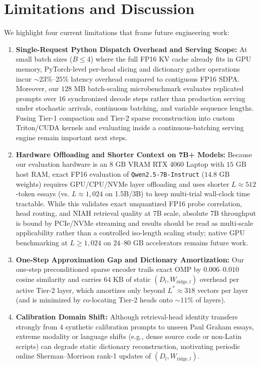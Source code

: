 \documentclass[conference]{IEEEtran}
\begin{document}
\section{Limitations and Discussion}
We highlight four current limitations that frame future engineering work:
\begin{enumerate}
    \item \textbf{Single-Request Python Dispatch Overhead and Serving Scope:} At small batch sizes ($B \le 4$) where the full FP16 KV cache already fits in GPU memory, PyTorch-level per-head slicing and dictionary gather operations incur $\sim 23\%$--$25\%$ latency overhead compared to contiguous FP16 SDPA. Moreover, our $128\text{ MB}$ batch-scaling microbenchmark evaluates replicated prompts over $16$ synchronized decode steps rather than production serving under stochastic arrivals, continuous batching, and variable sequence lengths. Fusing Tier-1 compaction and Tier-2 sparse reconstruction into custom Triton/CUDA kernels and evaluating inside a continuous-batching serving engine remain important next steps.
    \item \textbf{Hardware Offloading and Shorter Context on 7B+ Models:} Because our evaluation hardware is an $8\text{ GB}$ VRAM RTX 4060 Laptop with $15\text{ GB}$ host RAM, exact FP16 evaluation of \texttt{Qwen2.5-7B-Instruct} ($14.8\text{ GB}$ weights) requires GPU/CPU/NVMe layer offloading and uses shorter $L \approx 512$-token essays (vs. $L \approx 1{,}024$ on 1.5B/3B) to keep multi-trial wall-clock time tractable. While this validates exact unquantized FP16 probe correlation, head routing, and NIAH retrieval quality at 7B scale, absolute 7B throughput is bound by PCIe/NVMe streaming and results should be read as multi-scale applicability rather than a controlled iso-length scaling study; native GPU benchmarking at $L \ge 1{,}024$ on $24$--$80\text{ GB}$ accelerators remains future work.
    \item \textbf{One-Step Approximation Gap and Dictionary Amortization:} Our one-step preconditioned sparse encoder trails exact OMP by $0.006$--$0.010$ cosine similarity and carries $64\text{ KB}$ of static $(D_l, W_{\text{ridge},l})$ overhead per active Tier-2 layer, which amortizes only beyond $L^* \approx 318$ vectors per layer (and is minimized by co-locating Tier-2 heads onto $\sim 11\%$ of layers).
    \item \textbf{Calibration Domain Shift:} Although retrieval-head identity transfers strongly from $4$ synthetic calibration prompts to unseen Paul Graham essays, extreme modality or language shifts (e.g., dense source code or non-Latin scripts) can degrade static dictionary reconstruction, motivating periodic online Sherman--Morrison rank-1 updates of $(D_l, W_{\text{ridge},l})$.
\end{enumerate}
\end{document}
